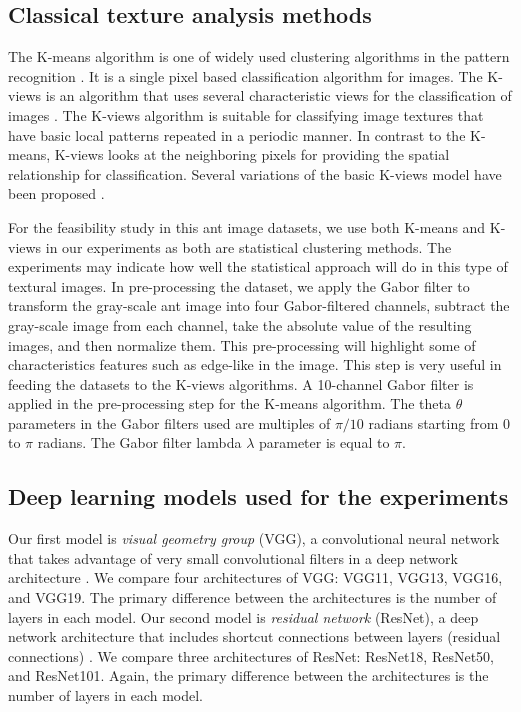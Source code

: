 \documentclass{aci}
\numberwithin{equation}{section}
\begin{document}
\subsection{Classical texture analysis methods}

The K-means algorithm is one of widely used clustering algorithms in the pattern
recognition \cite{lloyd_least_1982}. It is a single pixel based classification
algorithm for images. The K-views is an algorithm that uses several
characteristic views for the classification of images \cite{hung_use_2002}. The
K-views algorithm is suitable for classifying image textures that have basic
local patterns repeated in a periodic manner. In contrast to the K-means,
K-views looks at the neighboring pixels for providing the spatial relationship
for classification.  Several variations of the basic K-views model have been
proposed \cite{yang_image_2003, lan_improved_2010}.

For the feasibility study in this ant image datasets, we use both K-means and
K-views in our experiments as both are statistical clustering methods. The
experiments may indicate how well the statistical approach will do in this type
of textural images. In pre-processing the dataset, we apply the Gabor filter to
transform the gray-scale ant image into four Gabor-filtered channels, subtract
the gray-scale image from each channel, take the absolute value of the resulting
images, and then normalize them. This pre-processing will highlight some of
characteristics features such as edge-like in the image. This step is very
useful in feeding the datasets to the K-views algorithms. A 10-channel Gabor
filter is applied in the pre-processing step for the K-means algorithm. The
theta $\theta$ parameters in the Gabor filters used are multiples of $\pi/10$
radians starting from $0$ to $\pi$ radians. The Gabor filter lambda $\lambda$
parameter is equal to $\pi$.

\subsection{Deep learning models used for the experiments}

Our first model is \textit{visual geometry group} (VGG), a convolutional neural
network that takes advantage of very small convolutional filters in a deep
network architecture \cite{simonyan_very_2015}. We compare four architectures of
VGG: VGG11, VGG13, VGG16, and VGG19. The primary difference between the
architectures is the number of layers in each model. Our second model is
\textit{residual network} (ResNet), a deep network architecture that includes
shortcut connections between layers (residual connections) \cite{he_deep_2015}.
We compare three architectures of ResNet: ResNet18, ResNet50, and ResNet101.
Again, the primary difference between the architectures is the number of layers
in each model.
\end{document}
